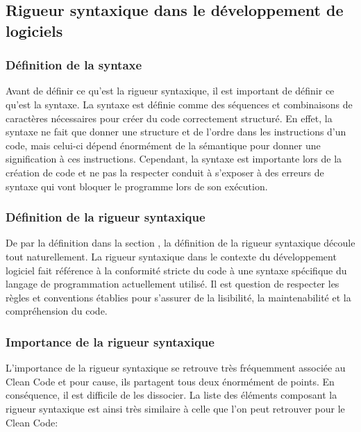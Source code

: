 \documentclass{rapport}
\begin{document}
\newpage
\subsection{Rigueur syntaxique dans le développement de logiciels}
\subsubsection{Définition de la syntaxe}
\label{subsubsec:defSynt}
Avant de définir ce qu'est la rigueur syntaxique, il est important de définir ce qu'est la syntaxe. La syntaxe est définie comme des séquences et combinaisons de caractères nécessaires pour créer du code correctement structuré. En effet, la syntaxe ne fait que donner une structure et de l'ordre dans les instructions d'un code, mais celui-ci dépend énormément de la sémantique pour donner une signification à ces instructions. Cependant, la syntaxe est importante lors de la création de code et ne pas la respecter conduit à s'exposer à des erreurs de syntaxe qui vont bloquer le programme lors de son exécution.

\subsubsection{Définition de la rigueur syntaxique}
De par la définition dans la section , la définition de la rigueur syntaxique découle tout naturellement. La rigueur syntaxique dans le contexte du développement logiciel fait référence à la conformité stricte du code à une syntaxe spécifique du langage de programmation actuellement utilisé. Il est question de respecter les règles et conventions établies pour  s'assurer de la lisibilité, la maintenabilité et la compréhension du code.

\subsubsection{Importance de la rigueur syntaxique}
L'importance de la rigueur syntaxique se retrouve très fréquemment associée au Clean Code et pour cause, ils partagent tous deux énormément de points. En conséquence, il est difficile de les dissocier. La liste des éléments composant la rigueur syntaxique est ainsi très similaire à celle que l'on peut retrouver pour le Clean Code:
\end{document}
